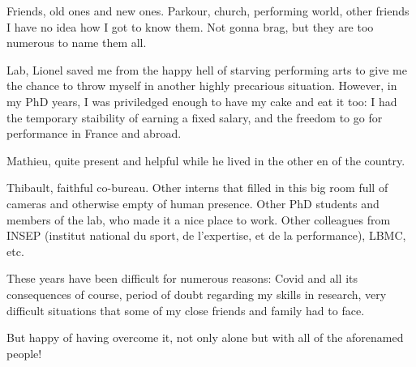 Friends, old ones and new ones. Parkour, church, performing world, other friends I have no idea how I got to know them. Not gonna brag, but they are too numerous to name them all. 

Lab, Lionel saved me from the happy hell of starving performing arts to give me the chance to throw myself in another highly precarious situation. However, in my PhD years, I was priviledged enough to have my cake and eat it too: I had the temporary staibility of earning a fixed salary, and the freedom to go for performance in France and abroad.

Mathieu, quite present and helpful while he lived in the other en of the country.

Thibault, faithful co-bureau. Other interns that filled in this big room full of cameras and otherwise empty of human presence. Other PhD students and members of the lab, who made it a nice place to work. Other colleagues from INSEP (institut national du sport, de l'expertise, et de la performance), LBMC, etc.

These years have been difficult for numerous reasons: Covid and all its consequences of course, period of doubt regarding my skills in research, very difficult situations that some of my close friends and family had to face.

But happy of having overcome it, not only alone but with all of the aforenamed people!